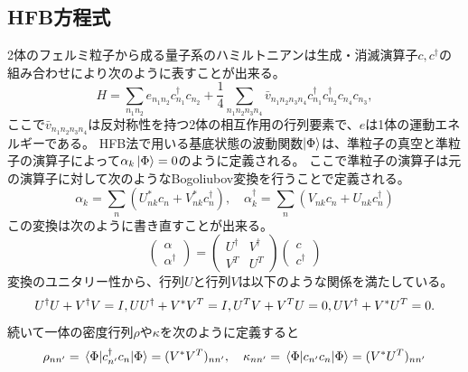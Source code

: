 \documentclass[12pt]{jarticle}
\begin{document}
\subsection{HFB方程式}
2体のフェルミ粒子から成る量子系のハミルトニアンは生成・消滅演算子$c,c^\dagger$の組み合わせにより次のように表すことが出来る。
\begin{equation}
    \label{hamiltonian}
    H = \sum_{n_1 n_2} e_{n_1 n_2}c_{n_1}^\dagger c_{n_2} + \frac{1}{4} \sum_{n_1 n_2 n_3 n_4}\bar{v}_{n_1 n_2 n_3 n_4}c_{n_1}^\dagger c_{n_2}^\dagger c_{n_4} c_{n_3},
\end{equation}
ここで$\bar{v}_{n_1 n_2 n_3 n_4}$は反対称性を持つ2体の相互作用の行列要素で、$e$は1体の運動エネルギーである。
HFB法で用いる基底状態の波動関数$\ket{\Phi}$は、準粒子の真空と準粒子の演算子によって$\alpha_k\ket{\Phi} = 0$のように定義される。
ここで準粒子の演算子は元の演算子に対して次のようなBogoliubov変換を行うことで定義される。
\begin{equation}
    \alpha_k = \sum_n(U_{nk}^*c_n + V_{nk}^* c_n^\dagger ),\quad \alpha_k^\dagger  = \sum_n(V_{nk}c_n + U_{nk} c_n^\dagger )
\end{equation}
この変換は次のように書き直すことが出来る。
\begin{equation}
    \left(\begin{array}{c}
            \alpha \\
            \alpha^\dagger
        \end{array}
    \right) =
    \begin{pmatrix}
        U^\dagger& V^\dagger\\
        V^T & U^T
    \end{pmatrix}
    \left(\begin{array}{c}
            c \\
            c^\dagger
        \end{array}
    \right)
\end{equation}
変換のユニタリー性から、行列$U$と行列$V$は以下のような関係を満たしている。
\begin{equation}
    U^\dagger U + V^\dagger V = I, \\
    UU^\dagger  + V^*V^T = I, \\
    U^{T}V + V^{T}U = 0, \\
    UV^\dagger  + V^*U^T = 0. 
\end{equation}
続いて一体の密度行列$\rho$や$\kappa$を次のように定義すると
\begin{equation}
    \label{rho-kappa}
    \rho_{nn'} = \mel{\Phi}{c_{n'}^\dagger c_n}{\Phi} = (V^*V^T){}_{nn'},\quad \kappa_{nn'} = \mel{\Phi}{c_{n'}c_n}{\Phi} = (V^*U^T){}_{nn'}
\end{equation}
\end{document}
